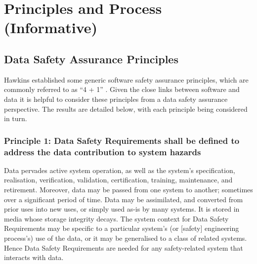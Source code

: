 %
%
\section{Principles and Process (Informative)} \label{bkm:principlesprocess}


\subsection{Data Safety Assurance Principles}
Hawkins  established some generic software safety assurance principles, which are commonly referred to as ``4 + 1'' \cite{citation:hawkins2013principles}. Given the close links between software and data it is helpful to consider these principles from a data safety assurance perspective. The results are detailed below, with each principle being considered in turn.

\subsubsection{Principle 1: Data Safety Requirements shall be defined to address the data contribution to system hazards}
Data pervades active system operation, as well as the system's specification, realisation, verification, validation, certification, \cbstart training\cbend, maintenance, and retirement. Moreover, data may be passed from one system to another; sometimes over a significant period of time. Data may be assimilated, and converted from prior uses into new uses, or simply used as-is by many systems. It is stored in media whose storage integrity decays. The system context for Data Safety Requirements may be specific to a particular system's (or [safety] engineering process's) use of the data, or it may be generalised to a class of related systems. Hence Data Safety Requirements are needed for any safety-related system that interacts with data.

